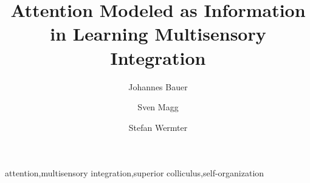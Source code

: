 \documentclass[a4paper]{elsarticle}
\title{Attention Modeled as Information in Learning Multisensory Integration}
\begin{document}
    \author[uhh]{Johannes Bauer}

    \author[uhh]{Sven Magg}

    \author[uhh]{Stefan Wermter}

    \address[uhh]{University of Hamburg\\ Department of Informatics\\ Knowledge Technology, WTM\\ Vogt-K\"olln-Stra\ss{}e 30\\ 22527 Hamburg\\ Germany}


    \begin{keyword}
        attention\sep multisensory integration\sep superior colliculus\sep self-organization
    \end{keyword}

	\maketitle
\end{document}
